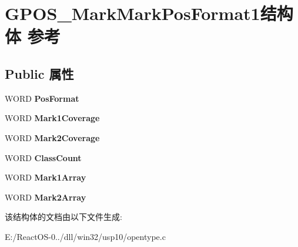 \hypertarget{struct_g_p_o_s___mark_mark_pos_format1}{}\section{G\+P\+O\+S\+\_\+\+Mark\+Mark\+Pos\+Format1结构体 参考}
\label{struct_g_p_o_s___mark_mark_pos_format1}
\subsection*{Public 属性}
\begin{DoxyCompactItemize}
\item 
\mbox{\label{struct_g_p_o_s___mark_mark_pos_format1_abdb3e384405c5684d160c27033e258bd}} 
W\+O\+RD {\bfseries Pos\+Format}
\item 
\mbox{\label{struct_g_p_o_s___mark_mark_pos_format1_a5caa45075e74ed7bdfa6027d0d447f9f}} 
W\+O\+RD {\bfseries Mark1\+Coverage}
\item 
\mbox{\label{struct_g_p_o_s___mark_mark_pos_format1_a8658e16b83565e4069f63bf24ca0f72f}} 
W\+O\+RD {\bfseries Mark2\+Coverage}
\item 
\mbox{\label{struct_g_p_o_s___mark_mark_pos_format1_a1f63ae1c8b590bc283986f6b0e7a1569}} 
W\+O\+RD {\bfseries Class\+Count}
\item 
\mbox{\label{struct_g_p_o_s___mark_mark_pos_format1_a115f7922edfb914698ea914f5cff1630}} 
W\+O\+RD {\bfseries Mark1\+Array}
\item 
\mbox{\label{struct_g_p_o_s___mark_mark_pos_format1_a5eae2c28d3c63182943cc56ddf37ec73}} 
W\+O\+RD {\bfseries Mark2\+Array}
\end{DoxyCompactItemize}


该结构体的文档由以下文件生成\+:\begin{DoxyCompactItemize}
\item 
E\+:/\+React\+O\+S-\/0../dll/win32/usp10/opentype.\+c\end{DoxyCompactItemize}

